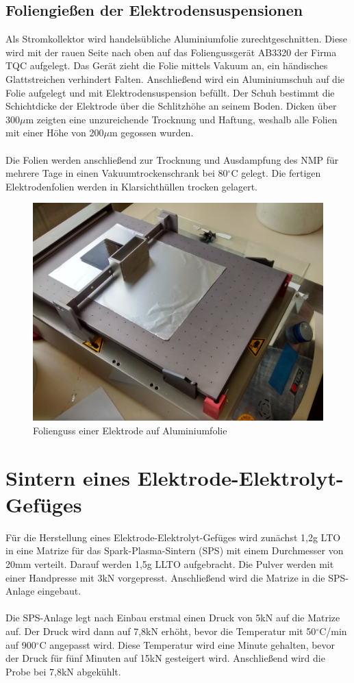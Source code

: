 \documentclass[a4paper, 11pt, headsepline,footsepline,twoside,abstract]{scrbook}
\begin{document}
\subsection{Foliengießen der Elektrodensuspensionen}
Als Stromkollektor wird handelsübliche Aluminiumfolie zurechtgeschnitten. Diese wird mit der rauen Seite nach oben auf das Foliengussgerät AB3320 der Firma TQC aufgelegt. Das Gerät zieht die Folie mittels Vakuum an, ein händisches Glattstreichen verhindert Falten. Anschließend wird ein Aluminiumschuh auf die Folie aufgelegt und mit Elektrodensuspension befüllt. Der Schuh bestimmt die Schichtdicke der Elektrode über die Schlitzhöhe an seinem Boden. Dicken über 300$\mu$m zeigten eine unzureichende Trocknung und Haftung, weshalb alle Folien mit einer Höhe von 200$\mu$m gegossen wurden.
\\\\
Die Folien werden anschließend zur Trocknung und Ausdampfung des NMP für mehrere Tage in einen Vakuumtrockenschrank bei 80$^\circ$C gelegt. Die fertigen Elektrodenfolien werden in Klarsichthüllen trocken gelagert.
\begin{figure}
	\centering
	\includegraphics[width=0.82\columnwidth]{images/folienguss.jpg}
	\caption{Folienguss einer Elektrode auf Aluminiumfolie}
	\label{folienguss}
\end{figure}
\section{Sintern eines Elektrode-Elektrolyt-Gefüges}
Für die Herstellung eines Elektrode-Elektrolyt-Gefüges wird zunächst 1,2g LTO in eine Matrize für das Spark-Plasma-Sintern (SPS) mit einem Durchmesser von 20mm verteilt. Darauf werden 1,5g LLTO aufgebracht. Die Pulver werden mit einer Handpresse mit 3kN vorgepresst. Anschließend wird die Matrize in die SPS-Anlage eingebaut. 
\\\\
Die SPS-Anlage legt nach Einbau erstmal einen Druck von 5kN auf die Matrize auf. Der Druck wird dann auf 7,8kN erhöht, bevor die Temperatur mit 50$^\circ$C/min auf 900$^\circ$C angepasst wird. Diese Temperatur wird eine Minute gehalten, bevor der Druck für fünf Minuten auf 15kN gesteigert wird. Anschließend wird die Probe bei 7,8kN abgekühlt. 
\end{document}
